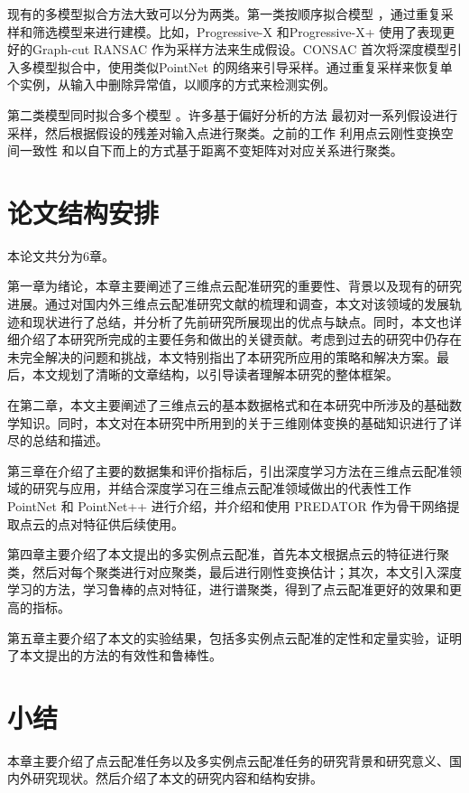 现有的多模型拟合方法大致可以分为两类。第一类按顺序拟合模型 \cite{barath2019progressive,barath2021progressive,kanazawa2004detection,kluger2020consac} ，通过重复采样和筛选模型来进行建模。比如，Progressive-X \cite{barath2019progressive} 和Progressive-X+ \cite{barath2021progressive} 使用了表现更好的Graph-cut RANSAC \cite{barath2018graph} 作为采样方法来生成假设。CONSAC \cite{kluger2020consac} 首次将深度模型引入多模型拟合中，使用类似PointNet \cite{qi2017pointnet} 的网络来引导采样。通过重复采样来恢复单个实例，从输入中删除异常值，以顺序的方式来检测实例。

第二类模型同时拟合多个模型 \cite{tang2022multi,toldo2008robust,magri2016multiple,magri2014t,magri2015robust} 。许多基于偏好分析的方法 \cite{toldo2008robust,magri2015robust} 最初对一系列假设进行采样，然后根据假设的残差对输入点进行聚类。之前的工作 \cite{tang2022multi} 利用点云刚性变换空间一致性 \cite{leordeanu2005spectral} 和以自下而上的方式基于距离不变矩阵对对应关系进行聚类。\\
\section{论文结构安排}
本论文共分为6章。

第一章为绪论，本章主要阐述了三维点云配准研究的重要性、背景以及现有的研究进展。通过对国内外三维点云配准研究文献的梳理和调查，本文对该领域的发展轨迹和现状进行了总结，并分析了先前研究所展现出的优点与缺点。同时，本文也详细介绍了本研究所完成的主要任务和做出的关键贡献。考虑到过去的研究中仍存在未完全解决的问题和挑战，本文特别指出了本研究所应用的策略和解决方案。最后，本文规划了清晰的文章结构，以引导读者理解本研究的整体框架。

在第二章，本文主要阐述了三维点云的基本数据格式和在本研究中所涉及的基础数学知识。同时，本文对在本研究中所用到的关于三维刚体变换的基础知识进行了详尽的总结和描述。

第三章在介绍了主要的数据集和评价指标后，引出深度学习方法在三维点云配准领域的研究与应用，并结合深度学习在三维点云配准领域做出的代表性工作 PointNet \cite{qi2017pointnet} 和 PointNet++ \cite{qi2017pointnet++} 进行介绍，并介绍和使用 PREDATOR \cite{huang2021predator} 作为骨干网络提取点云的点对特征供后续使用。

第四章主要介绍了本文提出的多实例点云配准，首先本文根据点云的特征进行聚类，然后对每个聚类进行对应聚类，最后进行刚性变换估计；其次，本文引入深度学习的方法，学习鲁棒的点对特征，进行谱聚类，得到了点云配准更好的效果和更高的指标。

第五章主要介绍了本文的实验结果，包括多实例点云配准的定性和定量实验，证明了本文提出的方法的有效性和鲁棒性。
\section{小结}
本章主要介绍了点云配准任务以及多实例点云配准任务的研究背景和研究意义、国内外研究现状。然后介绍了本文的研究内容和结构安排。
